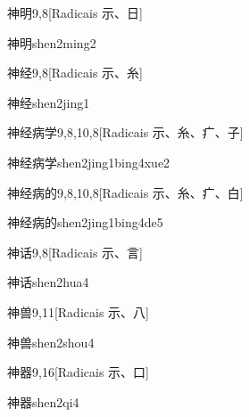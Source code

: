 \begin{entry}{神明}{9,8}[Radicais ⽰、⽇]
  \begin{phonetics}{神明}{shen2ming2}
  \end{phonetics}
\end{entry}

\begin{entry}{神经}{9,8}[Radicais ⽰、⽷]
  \begin{phonetics}{神经}{shen2jing1}
  \end{phonetics}
\end{entry}

\begin{entry}{神经病学}{9,8,10,8}[Radicais ⽰、⽷、⽧、⼦]
  \begin{phonetics}{神经病学}{shen2jing1bing4xue2}
  \end{phonetics}
\end{entry}

\begin{entry}{神经病的}{9,8,10,8}[Radicais ⽰、⽷、⽧、⽩]
  \begin{phonetics}{神经病的}{shen2jing1bing4de5}
  \end{phonetics}
\end{entry}

\begin{entry}{神话}{9,8}[Radicais ⽰、⾔]
  \begin{phonetics}{神话}{shen2hua4}
  \end{phonetics}
\end{entry}

\begin{entry}{神兽}{9,11}[Radicais ⽰、⼋]
  \begin{phonetics}{神兽}{shen2shou4}
  \end{phonetics}
\end{entry}

\begin{entry}{神器}{9,16}[Radicais ⽰、⼝]
  \begin{phonetics}{神器}{shen2qi4}
  \end{phonetics}
\end{entry}

